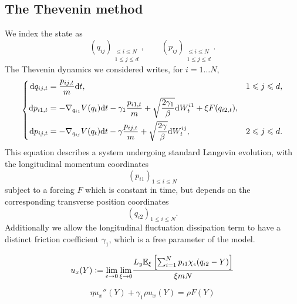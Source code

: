 \subsection{The Thevenin method}
We index the state as \[\left(q_{ij}\right)_{\substack{\leq i\leq N\\1\leq j\leq d}},\qquad \left(p_{ij}\right)_{\substack{\leq i\leq N\\1\leq j\leq d}}.\]
The Thevenin dynamics we considered writes, for $i=1\dots N$,
\begin{equation}
    \label{eq:thevenin_sv_dynamics}
    \left\{\begin{aligned}
        \mathrm{d} q_{ij,t}&=\frac{p_{ij,t}}m\mathrm{d} t,&1\leqslant j\leqslant d,\\
        \mathrm{d} p_{i1,t}&=-\nabla_{q_{i1}}V(q_t)\mathrm{d} t-\gamma_1\frac{p_{i1,t}}m+\sqrt{\frac{2\gamma_1}\beta}\mathrm{d} W_t^{i1}+\xi F(q_{i2,t}),&\\
        \mathrm{d} p_{ij,t}&=-\nabla_{q_{ij}}V(q_t)\mathrm{d} t-\gamma \frac{p_{ij,t}}m+\sqrt{\frac{2\gamma}\beta}\mathrm{d} W_t^{ij},&2\leqslant j\leqslant d.
    \end{aligned}\right.
\end{equation}
This equation describes a system undergoing standard Langevin evolution, with the longitudinal momentum coordinates 
\[\left(p_{i1}\right)_{1\leq i\leq N}\]
subject to a forcing $F$ which is constant in time, but depends on the corresponding transverse position coordinates
\[\left(q_{i2}\right)_{1\leq i\leq N}.\]
Additionally we allow the longitudinal fluctuation dissipation term to have a distinct friction coefficient $\gamma_1$, which is a free parameter of the model.

\begin{equation}
    \label{eq:velocity_profile}
    u_x(Y)\mathrel{\mathop:}= \underset{\epsilon \to 0}{\lim} \, \underset{\xi \to 0}{\lim} \frac{L_y\mathbb{E}_\xi \left[\sum_{i=1}^N p_{i1}\chi_\epsilon(q_{i2}-Y)\right]}{\xi mN}
\end{equation}

\begin{equation}
    \label{eq:shear_viscosity_relation}
    \eta u_x''(Y)+\gamma_1 \rho u_x(Y)=\rho F(Y)
\end{equation}

